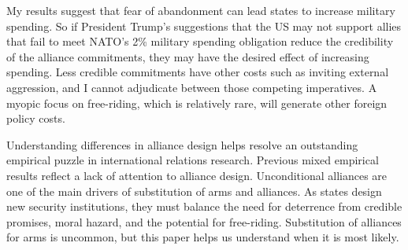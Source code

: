 \documentclass[12pt]{article}
\begin{document}
My results suggest that fear of abandonment can lead states to increase military spending. So if President Trump's suggestions that the US may not support allies that fail to meet NATO's 2\% military spending obligation reduce the credibility of the alliance commitments, they may have the desired effect of increasing spending. Less credible commitments have other costs such as inviting external aggression, and I cannot adjudicate between those competing imperatives. A myopic focus on free-riding, which is relatively rare, will generate other foreign policy costs. 

Understanding differences in alliance design helps resolve an outstanding empirical puzzle in international relations research. Previous mixed empirical results reflect a lack of attention to alliance design. Unconditional alliances are one of the main drivers of substitution of arms and alliances. As states design new security institutions, they must balance the need for deterrence from credible promises, moral hazard, and the potential for free-riding. Substitution of alliances for arms is uncommon, but this paper helps us understand when it is most likely. 






  
% 
\end{document}
